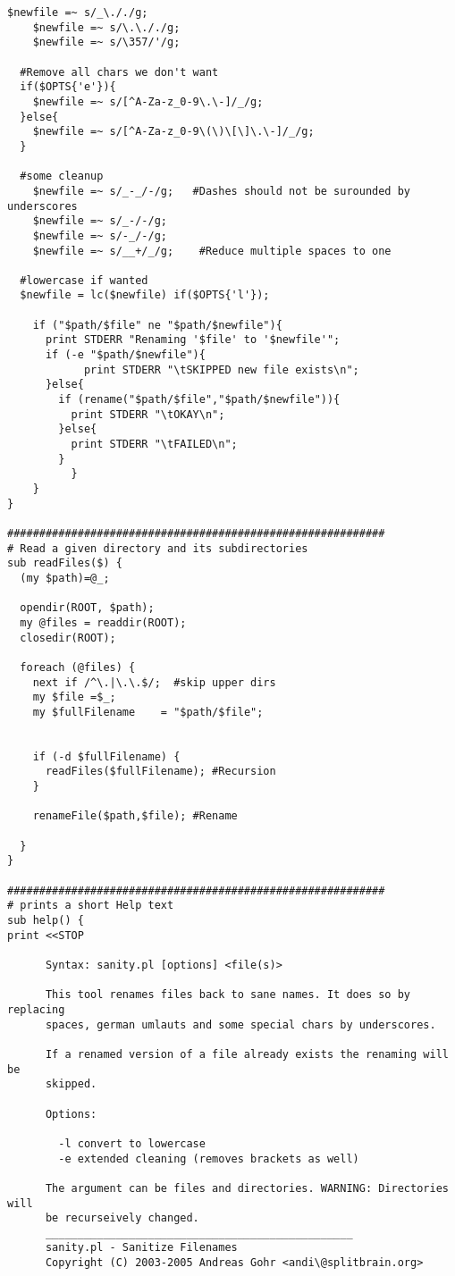 \begin{lstlisting}[style=archivo]
	$newfile =~ s/_\././g;
	$newfile =~ s/\.\././g;
	$newfile =~ s/\357/'/g;

  #Remove all chars we don't want
  if($OPTS{'e'}){
    $newfile =~ s/[^A-Za-z_0-9\.\-]/_/g;
  }else{
    $newfile =~ s/[^A-Za-z_0-9\(\)\[\]\.\-]/_/g;
  }

  #some cleanup
	$newfile =~ s/_-_/-/g;	 #Dashes should not be surounded by underscores
	$newfile =~ s/_-/-/g;
	$newfile =~ s/-_/-/g;
	$newfile =~ s/__+/_/g;    #Reduce multiple spaces to one

  #lowercase if wanted
  $newfile = lc($newfile) if($OPTS{'l'});

	if ("$path/$file" ne "$path/$newfile"){
	  print STDERR "Renaming '$file' to '$newfile'";
	  if (-e "$path/$newfile"){
            print STDERR "\tSKIPPED new file exists\n";
	  }else{
 	    if (rename("$path/$file","$path/$newfile")){
	      print STDERR "\tOKAY\n";
	    }else{
	      print STDERR "\tFAILED\n";
	    }
          }
	}
}

###########################################################
# Read a given directory and its subdirectories
sub readFiles($) {
  (my $path)=@_;
  
  opendir(ROOT, $path);
  my @files = readdir(ROOT);
  closedir(ROOT);

  foreach (@files) {
    next if /^\.|\.\.$/;  #skip upper dirs
    my $file =$_;
    my $fullFilename    = "$path/$file";
    
    
    if (-d $fullFilename) {
      readFiles($fullFilename); #Recursion
    }
    
    renameFile($path,$file); #Rename

  }
}

###########################################################
# prints a short Help text
sub help() {
print <<STOP

      Syntax: sanity.pl [options] <file(s)>

      This tool renames files back to sane names. It does so by replacing
      spaces, german umlauts and some special chars by underscores.

      If a renamed version of a file already exists the renaming will be
      skipped.

      Options:

        -l convert to lowercase
        -e extended cleaning (removes brackets as well)

      The argument can be files and directories. WARNING: Directories will
      be recurseively changed.
      ________________________________________________
      sanity.pl - Sanitize Filenames
      Copyright (C) 2003-2005 Andreas Gohr <andi\@splitbrain.org>


\end{lstlisting}
